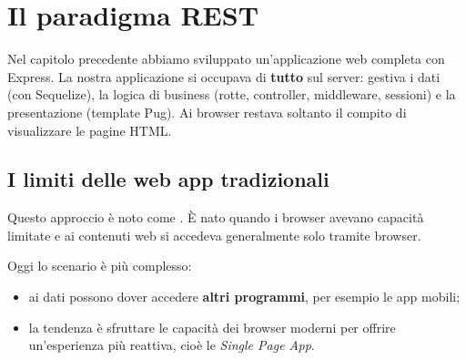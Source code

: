 \chapter{Il paradigma REST}

Nel capitolo precedente abbiamo sviluppato un'applicazione web completa con
Express. La nostra applicazione si occupava di \textbf{tutto} sul server: gestiva
i dati (con Sequelize), la logica di business (rotte, controller, middleware,
sessioni) e la presentazione (template Pug). Ai browser restava soltanto il
compito di visualizzare le pagine HTML.

\section{I limiti delle web app tradizionali}

Questo approccio è noto come . È nato quando i
browser avevano capacità limitate e ai contenuti web si accedeva generalmente
solo tramite browser.

Oggi lo scenario è più complesso:

\begin{itemize}
  \item ai dati possono dover accedere \textbf{altri programmi}, per esempio le
        app mobili;
  \item la tendenza è sfruttare le capacità dei browser moderni per offrire
        un'esperienza più reattiva, cioè le \textit{Single Page App}.
\end{itemize}


